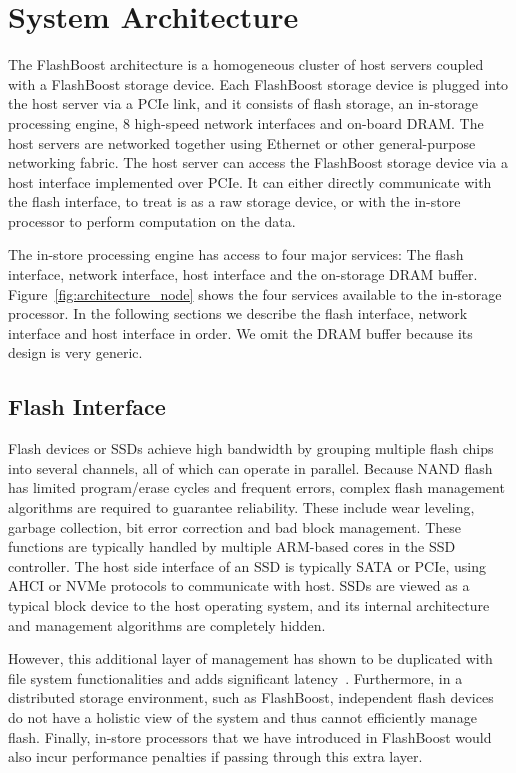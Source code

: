 \section{System Architecture}
\label{sec:architecture}


The FlashBoost architecture is a homogeneous cluster of host servers coupled
with a FlashBoost storage device. Each FlashBoost storage device is plugged into
the host server via a PCIe link, and it consists of flash storage, an in-storage
processing engine, 8 high-speed network interfaces and on-board DRAM. The host
servers are networked together using Ethernet or other general-purpose
networking fabric. The host server can access the FlashBoost storage device via
a host interface implemented over PCIe. It can either directly communicate with
the flash interface, to treat is as a raw storage device, or with the in-store
processor to perform computation on the data.

The in-store processing engine has access to four major services: The flash
interface, network interface, host interface and the on-storage DRAM buffer.
Figure~\ref{fig:architecture_node} shows the four services available to the
in-storage processor. In the following sections we describe the flash interface,
network interface and host interface in order. We omit the DRAM buffer because
its design is very generic.

\subsection{Flash Interface}

Flash devices or SSDs achieve high bandwidth by grouping multiple flash chips
into several channels, all of which can operate in parallel. Because NAND flash
has limited program/erase cycles and frequent errors, complex flash management
algorithms are required to guarantee reliability. These include wear leveling,
garbage collection, bit error correction and bad block management. These
functions are typically handled by multiple ARM-based cores in the SSD
controller. The host side interface of an SSD is typically SATA or PCIe, using
AHCI or NVMe protocols to communicate with host. SSDs are viewed
as a typical block device to the host operating system, and its internal
architecture and management algorithms are completely hidden. 

However, this additional layer of management has shown to be duplicated with
file system functionalities and adds significant latency~\cite{rfs}.
Furthermore, in a distributed storage environment, such as FlashBoost,
independent flash devices do not have a holistic view of the system and thus
cannot efficiently manage flash. Finally, in-store processors that we have
introduced in FlashBoost would also incur performance penalties if passing
through this extra layer. 

